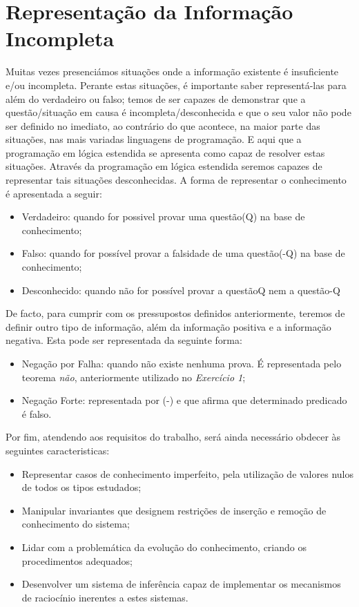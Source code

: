 \section{Representação da Informação Incompleta}


Muitas vezes presenciámos situações onde a informação existente é insuficiente e/ou incompleta.
Perante estas situações, é importante saber representá-las para além do verdadeiro ou
falso; temos de ser capazes de demonstrar que a questão/situação em causa é incompleta/desconhecida
e que o seu valor não pode ser definido no imediato, ao contrário do que acontece,
na maior parte das situações, nas mais variadas linguagens de programação.
E aqui que a programação em lógica estendida se apresenta como capaz de resolver estas
situações. Através da programação em lógica estendida seremos capazes de representar tais
situações desconhecidas. A forma de representar o conhecimento é apresentada a seguir:


\begin{itemize}
	\item Verdadeiro: quando for possivel provar uma questão(Q) na base de conhecimento; 
	\item Falso: quando for possível provar a falsidade de uma questão(-Q) na base de conhecimento;
	\item Desconhecido: quando não for possível provar a questãoQ nem a questão-Q
\end{itemize}


De facto, para cumprir com os pressupostos definidos anteriormente, teremos de definir outro tipo de informação, além da informação positiva e a informação negativa. Esta pode ser
representada da seguinte forma:


\begin{itemize}
	\item Negação por Falha: quando não existe nenhuma prova. É representada pelo teorema \textit{não}, anteriormente utilizado no \textit{Exercício 1};
	\item Negação Forte:  representada por (-) e que afirma que determinado predicado é falso.
\end{itemize}

Por fim, atendendo aos requisitos do trabalho, será ainda necessário obdecer às seguintes
caracteristicas:

\begin{itemize}
	\item Representar casos de conhecimento imperfeito, pela utilização de valores nulos de todos os tipos estudados;
	\item Manipular invariantes que designem restrições de inserção e remoção de conhecimento do sistema; 
	\item Lidar com a problemática da evolução do conhecimento, criando os procedimentos adequados;
	\item Desenvolver um sistema de inferência capaz de implementar os mecanismos de raciocínio inerentes a estes sistemas.

\end{itemize}

